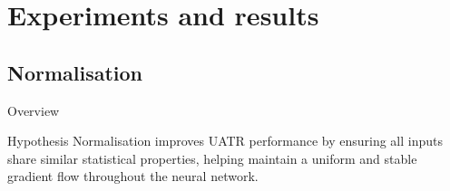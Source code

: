 \documentclass[]{beamer}
\begin{document}




\section{Experiments and results}

\subsection{Normalisation}

\begin{frame}{Overview}
    \begin{block}{Hypothesis}
    Normalisation improves UATR performance by ensuring all inputs share similar statistical properties, helping maintain a uniform and stable gradient flow throughout the neural network.
    \end{block}
    \vspace{0.2cm}
    
\end{frame}
\end{document}
